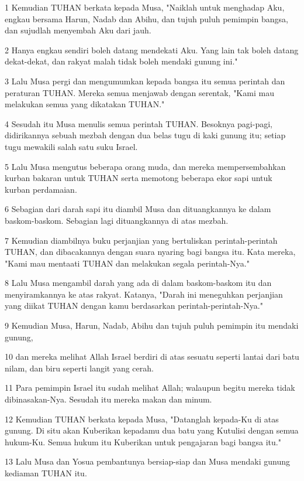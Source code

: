 \par 1 Kemudian TUHAN berkata kepada Musa, "Naiklah untuk menghadap Aku, engkau bersama Harun, Nadab dan Abihu, dan tujuh puluh pemimpin bangsa, dan sujudlah menyembah Aku dari jauh.
\par 2 Hanya engkau sendiri boleh datang mendekati Aku. Yang lain tak boleh datang dekat-dekat, dan rakyat malah tidak boleh mendaki gunung ini."
\par 3 Lalu Musa pergi dan mengumumkan kepada bangsa itu semua perintah dan peraturan TUHAN. Mereka semua menjawab dengan serentak, "Kami mau melakukan semua yang dikatakan TUHAN."
\par 4 Sesudah itu Musa menulis semua perintah TUHAN. Besoknya pagi-pagi, didirikannya sebuah mezbah dengan dua belas tugu di kaki gunung itu; setiap tugu mewakili salah satu suku Israel.
\par 5 Lalu Musa mengutus beberapa orang muda, dan mereka mempersembahkan kurban bakaran untuk TUHAN serta memotong beberapa ekor sapi untuk kurban perdamaian.
\par 6 Sebagian dari darah sapi itu diambil Musa dan dituangkannya ke dalam baskom-baskom. Sebagian lagi dituangkannya di atas mezbah.
\par 7 Kemudian diambilnya buku perjanjian yang bertuliskan perintah-perintah TUHAN, dan dibacakannya dengan suara nyaring bagi bangsa itu. Kata mereka, "Kami mau mentaati TUHAN dan melakukan segala perintah-Nya."
\par 8 Lalu Musa mengambil darah yang ada di dalam baskom-baskom itu dan menyiramkannya ke atas rakyat. Katanya, "Darah ini meneguhkan perjanjian yang diikat TUHAN dengan kamu berdasarkan perintah-perintah-Nya."
\par 9 Kemudian Musa, Harun, Nadab, Abihu dan tujuh puluh pemimpin itu mendaki gunung,
\par 10 dan mereka melihat Allah Israel berdiri di atas sesuatu seperti lantai dari batu nilam, dan biru seperti langit yang cerah.
\par 11 Para pemimpin Israel itu sudah melihat Allah; walaupun begitu mereka tidak dibinasakan-Nya. Sesudah itu mereka makan dan minum.
\par 12 Kemudian TUHAN berkata kepada Musa, "Datanglah kepada-Ku di atas gunung. Di situ akan Kuberikan kepadamu dua batu yang Kutulisi dengan semua hukum-Ku. Semua hukum itu Kuberikan untuk pengajaran bagi bangsa itu."
\par 13 Lalu Musa dan Yosua pembantunya bersiap-siap dan Musa mendaki gunung kediaman TUHAN itu.
